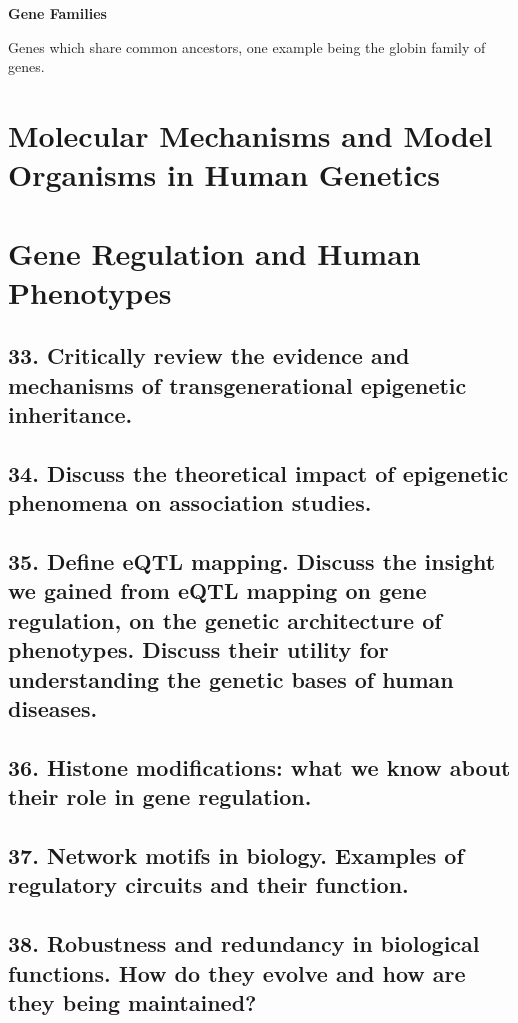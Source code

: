 \documentclass{tufte-handout}
\theoremstyle{noparens}
\begin{document}
\textbf{Gene Families}

Genes which share common ancestors, one example being the globin family of genes.

\section{Molecular Mechanisms and Model Organisms in Human Genetics}\label{sec:molecmech}

\section{Gene Regulation and Human Phenotypes}\label{sec:genreg}
\subsection{33. Critically review the evidence and mechanisms of transgenerational epigenetic inheritance.}

\newpage
\subsection{34. Discuss the theoretical impact of epigenetic phenomena on association studies.}

\newpage
\subsection{35. Define eQTL mapping. Discuss the insight we gained from eQTL mapping on gene regulation, on the genetic architecture of phenotypes. Discuss their utility for understanding the genetic bases of human diseases.}

\newpage
\subsection{36. Histone modifications: what we know about their role in gene regulation.}

\newpage
\subsection{37. Network motifs in biology. Examples of regulatory circuits and their function.}

\newpage
\subsection{38. Robustness and redundancy in biological functions. How do they evolve and how are they being maintained?}
\end{document}
